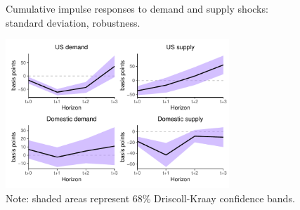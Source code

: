 \documentclass[12pt, a4paper]{article}
\begin{document}
\begin{figure}[H]
    \centering    
    \caption{Cumulative impulse responses to demand and supply shocks: standard deviation, robustness.}  
    \label{fig:std_robust}
    \includegraphics[width=0.75\textwidth]{Figures/std_demand_supply_LP_robust.pdf}
    \centering \caption*{Note: shaded areas represent 68\% Driscoll-Kraay confidence bands.}
\end{figure}
\end{document}
